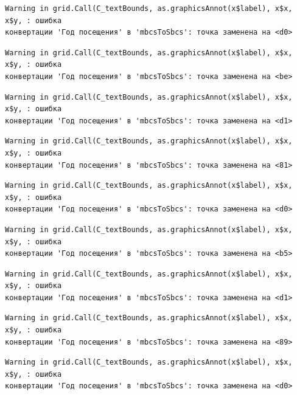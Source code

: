 \documentclass[
  letterpaper,
  DIV=11,
  numbers=noendperiod]{scrreprt}
\begin{document}
\begin{verbatim}
Warning in grid.Call(C_textBounds, as.graphicsAnnot(x$label), x$x, x$y, : ошибка
конвертации 'Год посещения' в 'mbcsToSbcs': точка заменена на <d0>
\end{verbatim}

\begin{verbatim}
Warning in grid.Call(C_textBounds, as.graphicsAnnot(x$label), x$x, x$y, : ошибка
конвертации 'Год посещения' в 'mbcsToSbcs': точка заменена на <be>
\end{verbatim}

\begin{verbatim}
Warning in grid.Call(C_textBounds, as.graphicsAnnot(x$label), x$x, x$y, : ошибка
конвертации 'Год посещения' в 'mbcsToSbcs': точка заменена на <d1>
\end{verbatim}

\begin{verbatim}
Warning in grid.Call(C_textBounds, as.graphicsAnnot(x$label), x$x, x$y, : ошибка
конвертации 'Год посещения' в 'mbcsToSbcs': точка заменена на <81>
\end{verbatim}

\begin{verbatim}
Warning in grid.Call(C_textBounds, as.graphicsAnnot(x$label), x$x, x$y, : ошибка
конвертации 'Год посещения' в 'mbcsToSbcs': точка заменена на <d0>
\end{verbatim}

\begin{verbatim}
Warning in grid.Call(C_textBounds, as.graphicsAnnot(x$label), x$x, x$y, : ошибка
конвертации 'Год посещения' в 'mbcsToSbcs': точка заменена на <b5>
\end{verbatim}

\begin{verbatim}
Warning in grid.Call(C_textBounds, as.graphicsAnnot(x$label), x$x, x$y, : ошибка
конвертации 'Год посещения' в 'mbcsToSbcs': точка заменена на <d1>
\end{verbatim}

\begin{verbatim}
Warning in grid.Call(C_textBounds, as.graphicsAnnot(x$label), x$x, x$y, : ошибка
конвертации 'Год посещения' в 'mbcsToSbcs': точка заменена на <89>
\end{verbatim}

\begin{verbatim}
Warning in grid.Call(C_textBounds, as.graphicsAnnot(x$label), x$x, x$y, : ошибка
конвертации 'Год посещения' в 'mbcsToSbcs': точка заменена на <d0>
\end{verbatim}
\end{document}
